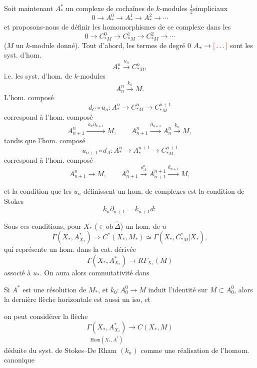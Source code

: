 \documentclass[11pt,a4paper]{article}
\begin{document}
Soit maintenant $A^*_*$ un  complexe de cochaînes de $k$-modules
$\frac{1}{2}$simpliciaux
\[
  0 \to A^0_* \to A^1_* \to A^2_* \to \cdots
\]
et proposons-nous de définir les homomorphismes de ce complexe dans les
\[
  0 \to C^0_{*M} \to C^1_{*M} \to C^2_{*M} \to \cdots
\]
($M$ un $k$-module donné). Tout d'abord, les termes de degré $0$ \ill{} \ill{}
$A_* \to \ill{}$  sont les syst. d'hom.
\[
  A^n_* \xrightarrow{u_n} C^n_{*M},
\]
i.e. les syst. d'hom. de $k$-modules
\[
  A^n_n \xrightarrow{k_n} M .
\]
\struck{\ill{}} L'hom. composé
\[
  d_C \circ u_n : A^n_* \longrightarrow C^n_{*M} \longrightarrow C^{n+1}_{*M}
\]
correspond à l'hom. composé
\[
  A^n_{n+1} \xrightarrow{\;k_n \partial_{n+1}\;} M,
  \qquad
  A^n_{n+1} \xrightarrow{\partial_{n+1}} A^n_n \xrightarrow{k_n} M,
\]
tandis que l'hom. composé
\[
  u_{n+1} \circ d_A : A^n_* \longrightarrow A^{n+1}_* \longrightarrow C^{n+1}_{*M}
\]
correspond à l'hom. composé
\[
  A^n_{n+1} \longrightarrow M,
  \qquad
  A^n_{n+1} \xrightarrow{d^n_A} A^{n+1}_{n+1} \xrightarrow{k_{n+1}} M,
\]

et la condition que les $u_n$ définissent un hom. de complexes est la \og condition de
Stokes \fg{}
\[
  k_n \partial_{n+1} = k_{n+1} d :
\]


Sous ces conditions, pour $X_*$ ($\in \mathrm{ob}\,\widehat{\Delta}$) \ill{} un hom.
 de $u$
\[
  \Gamma(X_*, A^*_{X_*}) \Longrightarrow C^*(X_*, M_*) \simeq \Gamma(X_*, C^*_{*M}|X_*),
\]
qui représente un hom. dans la cat. dérivée
\[
  \Gamma(X_*, A^*_{X_*}) \longrightarrow R\Gamma_{X_*}(M)
\]
associé à $u_*$. On aura alors commutativité dans


Si $A^*$ est une résolution de $M_*$, et $k_0 : A^0_0 \to M$ induit l'identité sur
$M \subset A^0_0$, alors la dernière flèche horizontale est aussi un iso, et

on peut considérer la flèche
\[
  \underset{\textstyle \mathrm{Hom}(X_*, A^*)}{\Gamma(X_*, A^*_{X_*})}
  \longrightarrow C(X_*, M)
\]
déduite du syst. de Stokes--De Rham $(k_n)$ comme une réalisation de l'homom. canonique
\end{document}
